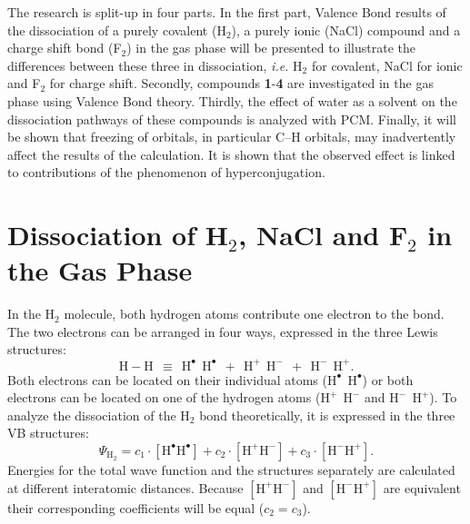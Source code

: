 The research is split-up in four parts.  In the first part, Valence Bond results of the dissociation of a purely covalent (H$_2$), a purely ionic (NaCl) compound and a charge shift bond (F$_2$) in the gas phase will be presented to illustrate the differences between these three in dissociation, \textit{i.e.} H$_2$ for covalent, NaCl for ionic and F$_2$ for charge shift. Secondly, compounds \textbf{1}-\textbf{4} are investigated in the gas phase using Valence Bond theory. Thirdly, the effect of water as a solvent on the dissociation pathways of these compounds is analyzed with PCM. Finally, it will be shown that freezing of orbitals, in particular C--H orbitals, may inadvertently affect the results of the calculation. It is shown that the observed effect is linked to contributions of the phenomenon of hyperconjugation.

\section{Dissociation of H$_2$, NaCl and F$_2$ in the Gas Phase}

In the H$_2$ molecule, both hydrogen atoms contribute one electron to the bond. The two electrons can be arranged in four ways, expressed in the three Lewis structures:
\begin{equation}
\nonumber
\mathrm{H-H\ \ \equiv \ \ H^{\bullet}\ \ H^{\bullet}\ \ +\ \ H^{+}\ \ H^{-}\ \ +\ \ H^{-}\ \ H^{+}}.
\end{equation}
Both electrons can be located on their individual atoms ($\mathrm{H^{\bullet}\ \ H^{\bullet}}$) or both electrons can be located on one of the hydrogen atoms ($\mathrm{H^{+}\ \ H^{-}}$ and $\mathrm{H^{-}\ \ H^{+}}$). To analyze the dissociation of the H$_2$ bond theoretically, it is expressed in the three VB structures:
\begin{equation}
\nonumber
\Psi_{\mathrm{H_2}} = c_1\cdot [\mathrm{H}^\bullet \mathrm{H}^\bullet] + c_2 \cdot [\mathrm{H}^{+}\mathrm{H}^{-}] + c_3 \cdot [\mathrm{H}^{-}\mathrm{H}^{+}]. 
\end{equation}
Energies for the total wave function and the structures separately are calculated at different interatomic distances. Because $[\mathrm{H}^{+}\mathrm{H}^{-}]$ and $[\mathrm{H}^{-}\mathrm{H}^{+}]$ are equivalent their corresponding coefficients will be equal ($c_2 = c_3$).  

